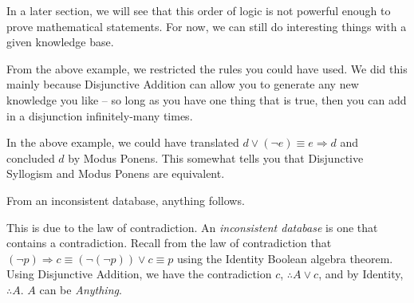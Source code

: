 \documentclass[main.tex]{subfiles}
\begin{document}
In a later section, we will see that this order of logic is not powerful enough to prove mathematical statements. For now, we can still do interesting things with a given knowledge base.


\begin{rem}
	From the above example, we restricted the rules you could have used. We did this mainly because Disjunctive Addition can allow you to generate any new knowledge you like -- so long as you have one thing that is true, then you can add in a disjunction infinitely-many times.
\end{rem}

\begin{rem}
	In the above example, we could have translated \(d \lor (\lnot e) \equiv e \Rightarrow d\) and concluded \(d\) by Modus Ponens. This somewhat tells you that Disjunctive Syllogism and Modus Ponens are equivalent.
\end{rem}

\begin{rem}
	From an inconsistent database, anything follows.
	
	This is due to the law of contradiction. An \textit{inconsistent database} is one that contains a contradiction. Recall from the law of contradiction that \((\lnot p) \Rightarrow c \equiv (\lnot (\lnot p)) \lor c \equiv p\) using the Identity Boolean algebra theorem. Using Disjunctive Addition, we have the contradiction \(c\), \(\therefore A \lor c\), and by Identity, \(\therefore A\). \(A\) can be \textit{Anything}.
\end{rem}
\end{document}
